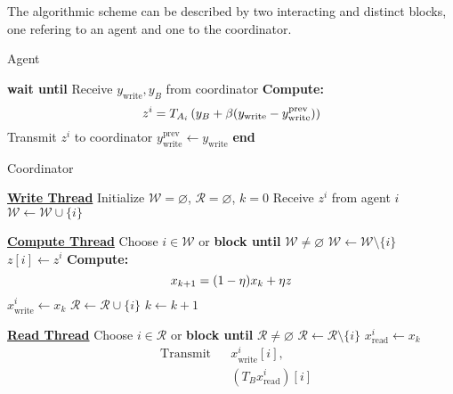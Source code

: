 \documentclass[envcountsect]{svjour3}
\let\emptyset\varnothing
\begin{document}
The algorithmic scheme can be described by two interacting and distinct blocks, one refering to an agent and one to the coordinator.
\begin{algorithm}[H]
\caption{Agent}
\label{al::AsInFBS_agent}
\begin{algorithmic}
 \STATE \textbf{wait until}
 \STATE \quad Receive $y_\mathrm{write}, y_B$ from coordinator
 \STATE \quad \textbf{Compute:} \begin{equation}{\label{eq::local_solve}}z^i = T_{A_{i}} \left( y_B+\beta(y_\mathrm{write}-y_\mathrm{write}^\mathrm{prev}) \right)\end{equation}
 \STATE \quad Transmit $z^i$ to coordinator
 \STATE \quad $y_\mathrm{write}^\mathrm{prev}\leftarrow y_\mathrm{write}$
 \STATE \textbf{end}
\end{algorithmic}
\end{algorithm}

\begin{algorithm}[H]
\caption{Coordinator}
\label{al::AsInFBS_coordinator}
  \begin{multicols}{3}
    \begin{algorithmic}
      \scriptsize
      \STATE \underline{\textbf{Write Thread}}
      \STATE Initialize $\mathcal{W}=\emptyset$, $\mathcal{R}=\emptyset$, $k=0$
      \REPEAT{}
       \STATE Receive $z^i$ from agent $i$
       \STATE $\mathcal{W}\leftarrow\mathcal{W}\cup\{i\}$
    \end{algorithmic}
    \columnbreak
    \begin{algorithmic}
      \scriptsize
      \STATE \underline{\textbf{Compute Thread}}
      \REPEAT{}
      \STATE Choose $i\in\mathcal{W}$ or \textbf{block until} $\mathcal{W}\neq\emptyset$
      \STATE $\mathcal{W}\leftarrow\mathcal{W}\setminus\{i\}$
      \STATE $z[i]\leftarrow z^i$
      \STATE \textbf{Compute:} \begin{equation}{\label{eq::FP_iter}}x_{k+1} = (1-\eta)x_{k} + \eta z\end{equation}
      \STATE $x^i_\mathrm{write}\leftarrow x_k$
      \STATE $\mathcal{R}\leftarrow\mathcal{R}\cup\{i\}$
      \STATE $k\leftarrow k+1$
    \end{algorithmic}
    \columnbreak
    \begin{algorithmic}
      \scriptsize
      \STATE \underline{\textbf{Read Thread}}
      \REPEAT{}
      \STATE Choose $i\in\mathcal{R}$ or \textbf{block until} $\mathcal{R}\neq\emptyset$
      \STATE $\mathcal{R}\leftarrow\mathcal{R}\setminus\{i\}$
      \STATE $x^i_\mathrm{read}\leftarrow x_k$
      \STATE \begin{align*}
             &\text{Transmit}  && x^i_\mathrm{write}[i],\\
             &                 && (T_B x^i_\mathrm{read})[i]
             \end{align*}
    \end{algorithmic}
  \end{multicols}
\end{algorithm}
\end{document}
